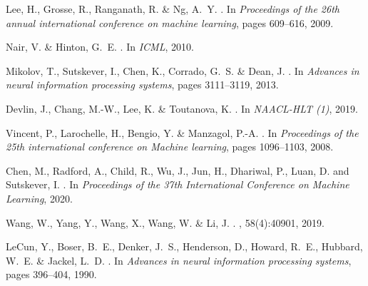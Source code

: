 \documentclass[review]{cvpr}
\begin{document}
{\small

%
\begin{thebibliography}{10}

Lee, H., Grosse, R., Ranganath, R. \&  Ng, A.~Y.
.
\newblock In {\em Proceedings of the 26th annual international conference on
  machine learning}, pages 609--616, 2009.


Nair, V. \&  Hinton, G.~E.
.
\newblock In {\em ICML}, 2010.


Mikolov, T., Sutskever, I., Chen, K., Corrado, G.~S. \&  Dean, J.
.
\newblock In {\em Advances in neural information processing systems}, pages
  3111--3119, 2013.


Devlin, J., Chang, M.-W., Lee, K. \&  Toutanova, K.
.
\newblock In {\em NAACL-HLT (1)}, 2019.


Vincent, P., Larochelle, H., Bengio, Y. \&  Manzagol, P.-A.
.
\newblock In {\em Proceedings of the 25th international conference on Machine
  learning}, pages 1096--1103, 2008.


Chen, M., Radford, A., Child, R., Wu, J., Jun, H., Dhariwal, P., Luan, D.
 and Sutskever, I.
.
\newblock In {\em Proceedings of the 37th International Conference on Machine
  Learning}, 2020.


Wang, W., Yang, Y., Wang, X., Wang, W. \&  Li, J.
.
, 58(4):40901, 2019.


LeCun, Y., Boser, B.~E., Denker, J.~S., Henderson, D., Howard, R.~E., Hubbard,
  W.~E. \&  Jackel, L.~D.
.
\newblock In {\em Advances in neural information processing systems}, pages
  396--404, 1990.



\end{thebibliography}}
\end{document}

